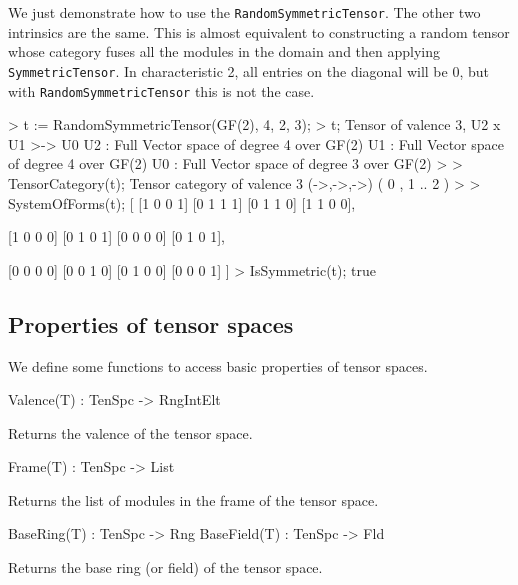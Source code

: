 \begin{example}[RandomSymTen]

We just demonstrate how to use the \texttt{RandomSymmetricTensor}. 
The other two intrinsics are the same.
This is almost equivalent to constructing a random tensor whose category fuses all the modules in the domain and then applying \texttt{SymmetricTensor}.
In characteristic 2, all entries on the diagonal will be 0, but with \texttt{RandomSymmetricTensor} this is not the case.
\begin{code}
> t := RandomSymmetricTensor(GF(2), 4, 2, 3);
> t;
Tensor of valence 3, U2 x U1 >-> U0
U2 : Full Vector space of degree 4 over GF(2)
U1 : Full Vector space of degree 4 over GF(2)
U0 : Full Vector space of degree 3 over GF(2)
> 
> TensorCategory(t);
Tensor category of valence 3 (->,->,->) ({ 0 },{ 1 .. 2 })
> 
> SystemOfForms(t);
[
    [1 0 0 1]
    [0 1 1 1]
    [0 1 1 0]
    [1 1 0 0],

    [1 0 0 0]
    [0 1 0 1]
    [0 0 0 0]
    [0 1 0 1],

    [0 0 0 0]
    [0 0 1 0]
    [0 1 0 0]
    [0 0 0 1]
]
> IsSymmetric(t);
true
\end{code}
\end{example}

\subsection{Properties of tensor spaces}

We define some functions to access basic properties of tensor spaces.

\begin{intrinsics}
Valence(T) : TenSpc -> RngIntElt
\end{intrinsics}

Returns the valence of the tensor space.

\begin{intrinsics}
Frame(T) : TenSpc -> List
\end{intrinsics}

Returns the list of modules in the frame of the tensor space.

\begin{intrinsics}
BaseRing(T) : TenSpc -> Rng
BaseField(T) : TenSpc -> Fld
\end{intrinsics}

Returns the base ring (or field) of the tensor space.


